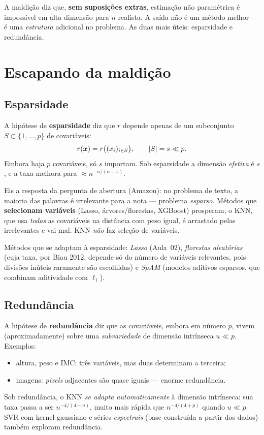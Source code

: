 \documentclass[11pt,a4paper]{article}
\begin{document}
\begin{atencao}
A maldição diz que, \textbf{sem suposições extras}, estimação não paramétrica é
impossível em alta dimensão para $n$ realista. A saída não é um método melhor ---
é uma \emph{estrutura} adicional no problema. As duas mais úteis: esparsidade e
redundância.
\end{atencao}

\section{Escapando da maldição}
\subsection{Esparsidade}
A hipótese de \textbf{esparsidade} diz que $r$ depende apenas de um subconjunto
$S\subset\{1,\dots,p\}$ de covariáveis:
\[
  r(\bm{x}) = r\big((x_i)_{i\in S}\big),\qquad \left\lvert S \right\rvert=s \ll p.
\]
Embora haja $p$ covariáveis, só $s$ importam. Sob esparsidade a dimensão
\emph{efetiva} é $s$, e a taxa melhora para $\approx n^{-\alpha/(\alpha+s)}$.

\begin{emsala}
Eis a resposta da pergunta de abertura (Amazon): no problema de texto, a maioria
das palavras é irrelevante para a nota --- problema \emph{esparso}. Métodos que
\textbf{selecionam variáveis} (Lasso, árvores/florestas, XGBoost) prosperam; o KNN,
que usa \emph{todas} as covariáveis na distância com peso igual, é arrastado pelas
irrelevantes e vai mal. KNN \emph{não} faz seleção de variáveis.
\end{emsala}

\begin{observacao}
Métodos que se adaptam à esparsidade: \emph{Lasso} (Aula~02), \emph{florestas
aleatórias} (cuja taxa, por Biau 2012, depende só do número de variáveis
relevantes, pois divisões inúteis raramente são escolhidas) e \emph{SpAM}
(modelos aditivos esparsos, que combinam aditividade com $\ell_1$).
\end{observacao}

\subsection{Redundância}
A hipótese de \textbf{redundância} diz que as covariáveis, embora em número $p$,
vivem (aproximadamente) sobre uma \emph{subvariedade} de dimensão intrínseca
$u\ll p$. Exemplos:
\begin{itemize}[leftmargin=1.4cm,nosep]
  \item altura, peso e IMC: três variáveis, mas duas determinam a terceira;
  \item imagens: \emph{pixels} adjacentes são quase iguais --- enorme redundância.
\end{itemize}
Sob redundância, o KNN \emph{se adapta automaticamente} à dimensão
intrínseca: sua taxa passa a ser $n^{-4/(4+u)}$, muito mais rápida que
$n^{-4/(4+p)}$ quando $u\ll p$. SVR com kernel gaussiano e séries \emph{espectrais}
(base construída a partir dos dados) também exploram redundância.
\end{document}
